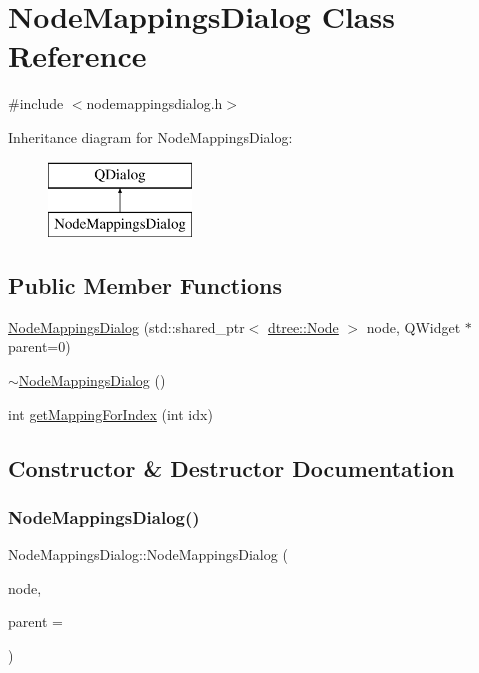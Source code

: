 \hypertarget{class_node_mappings_dialog}{}\section{Node\+Mappings\+Dialog Class Reference}
\label{class_node_mappings_dialog}


{\ttfamily \#include $<$nodemappingsdialog.\+h$>$}

Inheritance diagram for Node\+Mappings\+Dialog\+:\begin{figure}[H]
\begin{center}
\leavevmode
\includegraphics[height=2.000000cm]{db/d83/class_node_mappings_dialog}
\end{center}
\end{figure}
\subsection*{Public Member Functions}
\begin{DoxyCompactItemize}
\item 
\mbox{\hyperlink{class_node_mappings_dialog_a1f953adeb84433ccbdc92363b7e507d2}{Node\+Mappings\+Dialog}} (std\+::shared\+\_\+ptr$<$ \mbox{\hyperlink{classdtree_1_1_node}{dtree\+::\+Node}} $>$ node, Q\+Widget $\ast$parent=0)
\item 
\mbox{\hyperlink{class_node_mappings_dialog_ac67c07dccfdc38c20d831c4c1516261f}{$\sim$\+Node\+Mappings\+Dialog}} ()
\item 
int \mbox{\hyperlink{class_node_mappings_dialog_aa7cbc1a671202f147e7e60468c231e31}{get\+Mapping\+For\+Index}} (int idx)
\end{DoxyCompactItemize}


\subsection{Constructor \& Destructor Documentation}
\mbox{\label{class_node_mappings_dialog_a1f953adeb84433ccbdc92363b7e507d2}} 
\subsubsection{\texorpdfstring{NodeMappingsDialog()}{NodeMappingsDialog()}}
{\footnotesize\ttfamily Node\+Mappings\+Dialog\+::\+Node\+Mappings\+Dialog (\begin{DoxyParamCaption}\item[{std\+::shared\+\_\+ptr$<$ \mbox{\hyperlink{classdtree_1_1_node}{dtree\+::\+Node}} $>$}]{node,  }\item[{Q\+Widget $\ast$}]{parent = {} }\end{DoxyParamCaption})\hspace{0.3cm}{\ttfamily [explicit]}}


